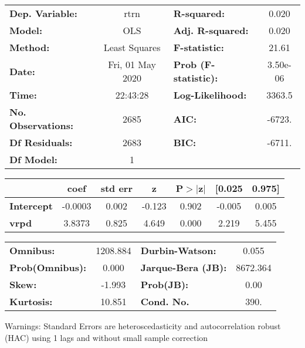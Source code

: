 \begin{center}
\begin{tabular}{lclc}
\toprule
\textbf{Dep. Variable:}    &       rtrn       & \textbf{  R-squared:         } &     0.020   \\
\textbf{Model:}            &       OLS        & \textbf{  Adj. R-squared:    } &     0.020   \\
\textbf{Method:}           &  Least Squares   & \textbf{  F-statistic:       } &     21.61   \\
\textbf{Date:}             & Fri, 01 May 2020 & \textbf{  Prob (F-statistic):} &  3.50e-06   \\
\textbf{Time:}             &     22:43:28     & \textbf{  Log-Likelihood:    } &    3363.5   \\
\textbf{No. Observations:} &        2685      & \textbf{  AIC:               } &    -6723.   \\
\textbf{Df Residuals:}     &        2683      & \textbf{  BIC:               } &    -6711.   \\
\textbf{Df Model:}         &           1      & \textbf{                     } &             \\
\bottomrule
\end{tabular}
\begin{tabular}{lcccccc}
                   & \textbf{coef} & \textbf{std err} & \textbf{z} & \textbf{P$> |$z$|$} & \textbf{[0.025} & \textbf{0.975]}  \\
\midrule
\textbf{Intercept} &      -0.0003  &        0.002     &    -0.123  &         0.902        &       -0.005    &        0.005     \\
\textbf{vrpd}      &       3.8373  &        0.825     &     4.649  &         0.000        &        2.219    &        5.455     \\
\bottomrule
\end{tabular}
\begin{tabular}{lclc}
\textbf{Omnibus:}       & 1208.884 & \textbf{  Durbin-Watson:     } &    0.055  \\
\textbf{Prob(Omnibus):} &   0.000  & \textbf{  Jarque-Bera (JB):  } & 8672.364  \\
\textbf{Skew:}          &  -1.993  & \textbf{  Prob(JB):          } &     0.00  \\
\textbf{Kurtosis:}      &  10.851  & \textbf{  Cond. No.          } &     390.  \\
\bottomrule
\end{tabular}
\end{center}

Warnings: \newline
 [1] Standard Errors are heteroscedasticity and autocorrelation robust (HAC) using 1 lags and without small sample correction
